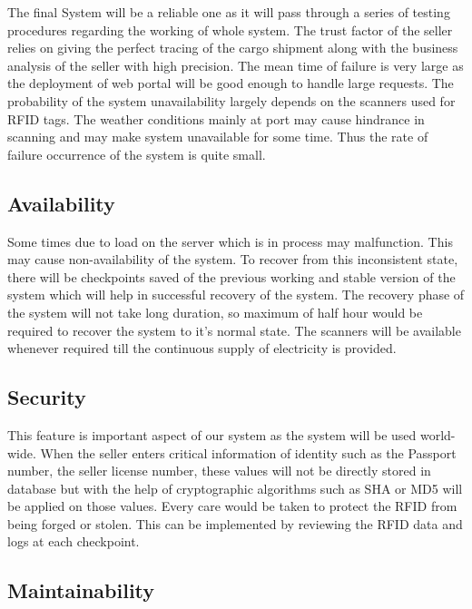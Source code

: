 \documentclass{scrreprt}
\begin{document}
    The final System will be a reliable one as it will pass through a series of testing procedures regarding the working of whole system. The trust factor of the seller relies on giving the perfect tracing of the cargo shipment along with the business analysis of the seller with high precision. The mean time of failure is very large as the deployment of web portal will be good enough to handle large requests. The probability of the system unavailability largely depends on the scanners used for RFID tags. The weather conditions mainly at port may cause hindrance in scanning and may make system unavailable for some time. Thus the rate of failure occurrence of the system is quite small. \newline
    
    \subsection{ Availability}
    
    Some times due to load on the server which is in process may malfunction. This may cause non-availability of the system. To recover from this inconsistent state, there will be checkpoints saved of the previous working and stable version of the system which will help in successful recovery of the system. The recovery phase of the system will not take long duration, so maximum of half hour would be required to recover the system to it's normal state. The scanners will be available whenever required till the continuous supply of electricity is provided.
    
    \subsection{ Security}
    
    This feature is important aspect of our system as the system will be used world-wide. When the seller enters critical information of identity such as the Passport number, the seller license number, these values will not be directly stored in database but with the help of cryptographic algorithms such as SHA or MD5 will be applied on those values. Every care would be taken to protect the RFID from being forged or stolen. This can be implemented by reviewing the RFID data and logs at each checkpoint. \newline
    
    \subsection{ Maintainability}
    
\end{document}
